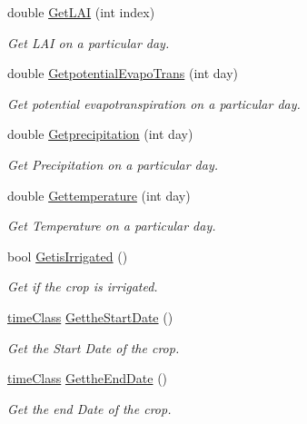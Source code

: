 \begin{DoxyCompactItemize}
double \mbox{\hyperlink{class_crop_class_ac921e5d0df8c03bb12ef9113cb27337d}{Get\+L\+AI}} (int index)
\begin{DoxyCompactList}\small\item\em Get L\+AI on a particular day. \end{DoxyCompactList}\item 
double \mbox{\hyperlink{class_crop_class_aaff60f42755eee618996358238af406f}{Getpotential\+Evapo\+Trans}} (int day)
\begin{DoxyCompactList}\small\item\em Get potential evapotranspiration on a particular day. \end{DoxyCompactList}\item 
double \mbox{\hyperlink{class_crop_class_a00394efec24c23157da2658408cc4271}{Getprecipitation}} (int day)
\begin{DoxyCompactList}\small\item\em Get Precipitation on a particular day. \end{DoxyCompactList}\item 
double \mbox{\hyperlink{class_crop_class_abf25b1d4e148fc959909d187693b20e1}{Gettemperature}} (int day)
\begin{DoxyCompactList}\small\item\em Get Temperature on a particular day. \end{DoxyCompactList}\item 
bool \mbox{\hyperlink{class_crop_class_a05dda60a40d7bad3e932a37acfffc0d5}{Getis\+Irrigated}} ()
\begin{DoxyCompactList}\small\item\em Get if the crop is irrigated. \end{DoxyCompactList}\item 
\mbox{\hyperlink{classtime_class}{time\+Class}} \mbox{\hyperlink{class_crop_class_aaa4a4eaf4aad0fd117c7d5f3c9f773a1}{Getthe\+Start\+Date}} ()
\begin{DoxyCompactList}\small\item\em Get the Start Date of the crop. \end{DoxyCompactList}\item 
\mbox{\hyperlink{classtime_class}{time\+Class}} \mbox{\hyperlink{class_crop_class_aaa5259912a66a71755997fbca4a3f6c1}{Getthe\+End\+Date}} ()
\begin{DoxyCompactList}\small\item\em Get the end Date of the crop. \end{DoxyCompactList}\item 

\end{DoxyCompactItemize}
